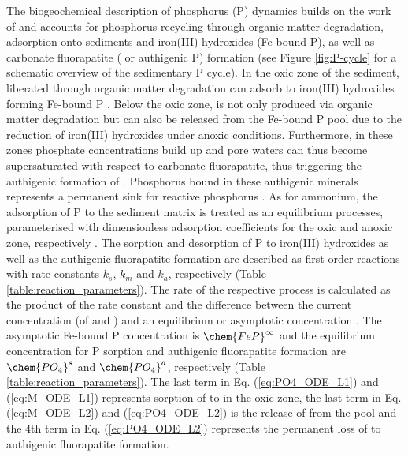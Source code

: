 \documentclass[gmd, manuscript]{copernicus}
\begin{document}
The biogeochemical description of phosphorus (P) dynamics builds on the work of \citet{caroline_p_slomp_key_1996} and accounts for phosphorus recycling through organic matter degradation, adsorption onto sediments and 
iron(III) hydroxides (Fe-bound P), as well as carbonate fluorapatite ( or authigenic P) formation (see Figure \ref{fig:P-cycle} for a schematic overview of the sedimentary P cycle). 
In the oxic zone of the sediment,  liberated through organic matter degradation can adsorb 
to iron(III) hydroxides forming Fe-bound P \citep[or ,][]{slomp1998role}. Below the oxic zone,   is not only produced via organic matter degradation but can also be released from the Fe-bound P pool due to the 
reduction of iron(III) hydroxides under anoxic conditions. Furthermore, in these zones phosphate concentrations build up and pore waters can thus become supersaturated with respect to carbonate fluorapatite, 
thus triggering the authigenic formation of  \citep{cappellen_mathematical_1988}. Phosphorus bound in these authigenic minerals represents a permanent sink for reactive phosphorus \citep{caroline_p_slomp_key_1996}. 
As for ammonium, the adsorption of P to the sediment matrix is treated as an equilibrium processes, parameterised with dimensionless adsorption coefficients for the oxic and anoxic zone, 
respectively \citep[$K_\chem{PO_4}^{\mathrm{ox}}$, $K_\chem{PO_4}^{\mathrm{anox}}$][]{slomp1998role}. 
The sorption and desorption of P to iron(III) hydroxides as well as the authigenic fluorapatite formation are described as first-order reactions with rate constants $k_s$, $k_m$ and $k_a$, respectively (Table \ref{table:reaction_parameters}). 
The rate of the respective process is calculated as the product of the rate constant and the difference between the current concentration (of  and ) and an equilibrium or asymptotic concentration \citet{caroline_p_slomp_key_1996}. 
The asymptotic Fe-bound P concentration is $\chem{FeP}^\infty$ and the equilibrium concentration for P sorption and authigenic fluorapatite formation are $\chem{PO_4}^s$ and $\chem{PO_4}^a$, respectively (Table \ref{table:reaction_parameters}). 
The last term in Eq. (\ref{eq:PO4_ODE_L1}) and (\ref{eq:M_ODE_L1}) represents sorption of  to  in the oxic zone, the last term in 
Eq. (\ref{eq:M_ODE_L2}) and (\ref{eq:PO4_ODE_L2}) is the release of  from the  pool and the 4th term in Eq. (\ref{eq:PO4_ODE_L2}) represents the permanent 
loss of  to authigenic fluorapatite formation. 
\end{document}
